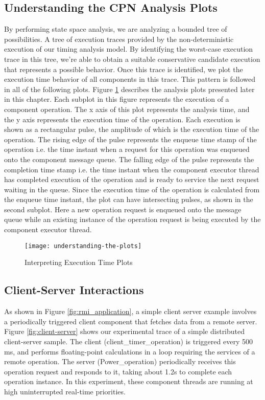 \subsection{Understanding the CPN Analysis Plots}

By performing state space analysis, we are analyzing a bounded tree of possibilities. A tree of execution traces provided by the non-deterministic execution of our timing analysis model. By identifying the worst-case execution trace in this tree, we're able to obtain a suitable conservative candidate execution that represents a possible behavior. Once this trace is identified, we plot the execution time behavior of all components in this trace. This pattern is followed in all of the following plots. Figure \ref{fig:understanding-the-plots} describes the analysis plots presented later in this chapter. Each subplot in this figure represents the execution of a component operation. The x axis of this plot represents the analysis time, and the y axis represents the execution time of the operation. Each execution is shown as a rectangular pulse, the amplitude of which is the execution time of the operation. The rising edge of the pulse represents the enqueue time stamp of the operation i.e. the time instant when a request for this operation was enqueued onto the component message queue. The falling edge of the pulse represents the completion time stamp i.e. the time instant when the component executor thread has completed execution of the operation and is ready to service the next request waiting in the queue. Since the execution time of the operation is calculated from the enqueue time instant, the plot can have intersecting pulses, as shown in the second subplot. Here a new operation request is enqueued onto the message queue while an existing instance of the operation request is being executed by the component executor thread. 

\begin{figure}[h]
	\centering
	\texttt{[image: understanding-the-plots]}
	\caption{Interpreting Execution Time Plots}
	\label{fig:understanding-the-plots}
\end{figure}
\FloatBarrier


\subsection{Client-Server Interactions}

As shown in Figure \ref{fig:rmi_application}, a simple client server example involves a periodically triggered client component that fetches data from a remote server. Figure \ref{fig:client-server} shows our experimental trace of a simple distributed client-server sample. The client (client\_timer\_operation) is triggered every 500 ms, and performs floating-point calculations in a loop requiring the services of a remote operation.  %
The server (Power\_operation) periodically receives this operation request and responds to it, taking about 1.2s to complete each operation instance. In this experiment, these component threads are running at high uninterrupted real-time priorities. 

